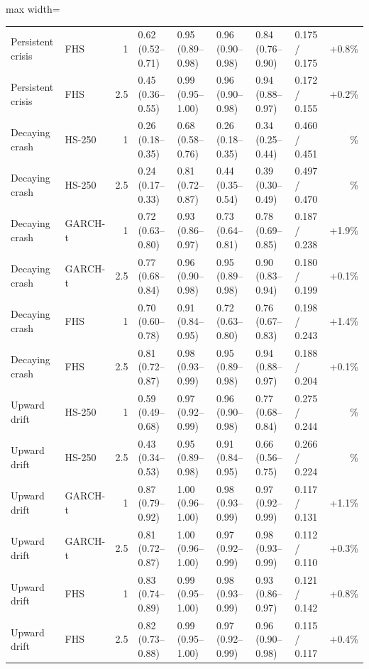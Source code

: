 \begin{table}[htbp]
{\begin{adjustbox}{max width=\textwidth}
\begin{tabular}{llrlllllr}
Persistent crisis & FHS & 1 & 0.62 (0.52--0.71) & 0.95 (0.89--0.98) & 0.96 (0.90--0.98) & 0.84 (0.76--0.90) & 0.175 / 0.175 & \relax +0.8\% \\
Persistent crisis & FHS & 2.5 & 0.45 (0.36--0.55) & 0.99 (0.95--1.00) & 0.96 (0.90--0.98) & 0.94 (0.88--0.97) & 0.172 / 0.155 & \relax +0.2\% \\
Decaying crash & HS-250 & 1 & 0.26 (0.18--0.35) & 0.68 (0.58--0.76) & 0.26 (0.18--0.35) & 0.34 (0.25--0.44) & 0.460 / 0.451 & \relax -27.8\% \\
Decaying crash & HS-250 & 2.5 & 0.24 (0.17--0.33) & 0.81 (0.72--0.87) & 0.44 (0.35--0.54) & 0.39 (0.30--0.49) & 0.497 / 0.470 & \relax -14.1\% \\
Decaying crash & GARCH-t & 1 & 0.72 (0.63--0.80) & 0.93 (0.86--0.97) & 0.73 (0.64--0.81) & 0.78 (0.69--0.85) & 0.187 / 0.238 & \relax +1.9\% \\
Decaying crash & GARCH-t & 2.5 & 0.77 (0.68--0.84) & 0.96 (0.90--0.98) & 0.95 (0.89--0.98) & 0.90 (0.83--0.94) & 0.180 / 0.199 & \relax +0.1\% \\
Decaying crash & FHS & 1 & 0.70 (0.60--0.78) & 0.91 (0.84--0.95) & 0.72 (0.63--0.80) & 0.76 (0.67--0.83) & 0.198 / 0.243 & \relax +1.4\% \\
Decaying crash & FHS & 2.5 & 0.81 (0.72--0.87) & 0.98 (0.93--0.99) & 0.95 (0.89--0.98) & 0.94 (0.88--0.97) & 0.188 / 0.204 & \relax +0.1\% \\
Upward drift & HS-250 & 1 & 0.59 (0.49--0.68) & 0.97 (0.92--0.99) & 0.96 (0.90--0.98) & 0.77 (0.68--0.84) & 0.275 / 0.244 & \relax -2.2\% \\
Upward drift & HS-250 & 2.5 & 0.43 (0.34--0.53) & 0.95 (0.89--0.98) & 0.91 (0.84--0.95) & 0.66 (0.56--0.75) & 0.266 / 0.224 & \relax -1.4\% \\
Upward drift & GARCH-t & 1 & 0.87 (0.79--0.92) & 1.00 (0.96--1.00) & 0.98 (0.93--0.99) & 0.97 (0.92--0.99) & 0.117 / 0.131 & \relax +1.1\% \\
Upward drift & GARCH-t & 2.5 & 0.81 (0.72--0.87) & 1.00 (0.96--1.00) & 0.97 (0.92--0.99) & 0.98 (0.93--0.99) & 0.112 / 0.110 & \relax +0.3\% \\
Upward drift & FHS & 1 & 0.83 (0.74--0.89) & 0.99 (0.95--1.00) & 0.98 (0.93--0.99) & 0.93 (0.86--0.97) & 0.121 / 0.142 & \relax +0.8\% \\
Upward drift & FHS & 2.5 & 0.82 (0.73--0.88) & 0.99 (0.95--1.00) & 0.97 (0.92--0.99) & 0.96 (0.90--0.98) & 0.115 / 0.117 & \relax +0.4\% \\
\bottomrule
\end{tabular}
\end{adjustbox}}
\end{table}
